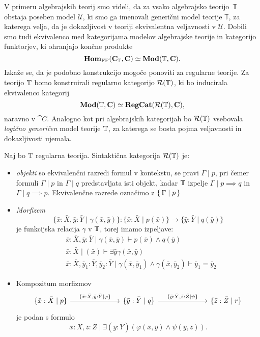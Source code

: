 \documentclass[../kategoricna_logika.tex]{subfiles}
\begin{document}
V primeru algebrajskih teorij smo videli, da za vsako algebrajsko
teorijo~$\mathbb{T}$ obstaja poseben model $\mathcal{U}$, ki smo ga
imenovali generični model teorije $\mathbb{T}$, za katerega velja, da
je dokazljivost v teoriji ekvivalentna veljavnosti v $\mathcal{U}$.
Dobili smo tudi ekvivalenco med kategorijama modelov algebrajske
teorije in kategorijo funktorjev, ki ohranjajo končne produkte
$$\mathbf{Hom}_{\mathrm{FP}}({\operatorname{\mathbf{C}}}_{\mathbb{T}}, {\operatorname{\mathbf{C}}}) \simeq \mathbf{Mod}(\mathbb{T}, {\operatorname{\mathbf{C}}}).$$
Izkaže se, da je podobno konstrukcijo mogoče ponoviti za regularne
teorije.  Za teorijo $\mathbb{T}$ bomo konstruirali regularno kategorijo
$\mathcal{R}(\mathbb{T})$, ki bo inducirala ekvivalenco kategorij
$$\mathbf{Mod}(\mathbb{T}, {\operatorname{\mathbf{C}}}) \simeq {\operatorname{\mathbf{RegCat}}}(\mathcal{R}(\mathbb{T}), {\operatorname{\mathbf{C}}}),$$
naravno v $\cat{C}$. Analogno kot pri algebrajskih kategorijah bo
$\mathcal{R}(\mathbb{T})$ vsebovala \emph{logično generičen} model teorije
$\mathbb{T}$, za katerega se bosta pojma veljavnosti in dokazljivosti ujemala.
\begin{definicija}
  Naj bo $\mathbb{T}$ regularna teorija.
  Sintaktična kategorija $\mathcal{R}(\mathbb{T})$ je:
  \begin{itemize}
  \item \emph{objekti} so ekvivalenčni razredi
    formul v kontekstu, se pravi $\Gamma \mid p$, pri čemer formuli
    $\Gamma \mid p$ in $\Gamma \mid q$ predstavljata isti objekt, kadar
    $\mathbb{T}$ izpelje $\Gamma \mid p \implies q$ in $\Gamma \mid q \implies p$. 
      Ekvivalenčne razrede označimo z $\lbrace\,\Gamma  \mid  p\,\rbrace$
    \item
      \emph{Morfizem}
      $$\{ \bar{x} : \bar{X}, \bar{y} : \bar{Y} \mid \gamma(\bar{x},\bar{y})\} : \{\bar{x}:\bar{X} \mid p(\bar{x})\}
      \to \{\bar{y} : \bar{Y} \mid q(\bar{y})\}$$
      je funkcijska relacija $\gamma$ v $\mathbb{T}$, torej imamo izpeljave:
      \begin{align*}
        &\bar{x}:\bar{X},\bar{y}:\bar{Y} \mid \gamma(\bar{x},\bar{y})
          \vdash p(\bar{x}) \wedge q(\bar{y}) \\
        &\bar{x}:\bar{X} \mid (\bar{x}) \vdash \exists \bar{y} \gamma(\bar{x},\bar{y}) \\
        &\bar{x}:\bar{X},\bar{y}_1 : \bar{Y},\bar{y}_2:\bar{Y} \mid
          \gamma(\bar{x},\bar{y}_1) \wedge \gamma(\bar{x},\bar{y}_2) \vdash \bar{y}_1 = \bar{y}_2
      \end{align*}
      
    \item Kompozitum morfizmov
      \begin{equation*}
        \begin{tikzcd}[column sep=7em]
          \lbrace \bar{x} : \bar{X} \mid p \rbrace \ar[r, "{\lbrace \bar{x}:\bar{X}, \bar{y}:\bar{Y} \mid \varphi
          \rbrace}"] & \lbrace \bar{y}:\bar{Y} \mid q \rbrace \ar[r, "{\lbrace \bar{y}:\bar{Y}, \bar{z}:\bar{Z} \mid
          \psi \rbrace}"] & \lbrace \bar{z}:\bar{Z} \mid r \rbrace
        \end{tikzcd}
      \end{equation*}
      je podan s formulo
      \[ \bar{x}:\bar{X}, \bar{z}:\bar{Z} \mid \exists (\bar{y}:\bar{Y}) (\varphi(\bar{x},\bar{y}) \wedge
        \psi(\bar{y},\bar{z})).\]
    \end{itemize}
  \end{definicija}
\end{document}
